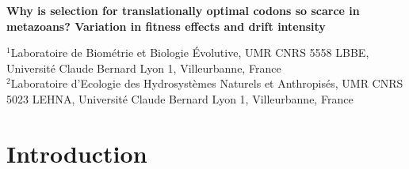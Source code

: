     \newpage
    
    \vspace*{10pt}
    
    \begin{center}
    \Large{\textbf{Why is selection for translationally optimal codons so scarce in metazoans? Variation in fitness effects and drift intensity}} \\
    \end{center}

    
    \begin{flushleft}
    
    \small
    \begin{center}
    $^{1}$Laboratoire de Biométrie et Biologie Évolutive, UMR CNRS 5558 LBBE, Université Claude Bernard Lyon 1, Villeurbanne, France\\
    $^{2}$Laboratoire d'Ecologie des Hydrosystèmes Naturels et Anthropisés, UMR CNRS 5023 LEHNA, Université Claude Bernard Lyon 1, Villeurbanne, France\\
    \end{center}
    \end{flushleft}

    {\hypersetup{linkcolor=GREYDARK}\minitoc}

    \newpage
    
\graphicspath{{chap7-Translational Selection/figures/}}



\section{Introduction}\label{sec:Introduction}

